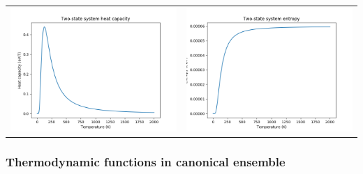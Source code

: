 \documentclass[11pt]{article}
\begin{document}
\begin{table}
\begin{tabular}{cc}
\includegraphics[scale=0.5]{Images/2state-heatcapacity.png} & \includegraphics[scale=0.5]{Images/2state-entropy.png}
\end{tabular}
\end{table}

\subsubsection{Thermodynamic functions in canonical ensemble}
\label{sec:orgde10e6c}
\end{document}
